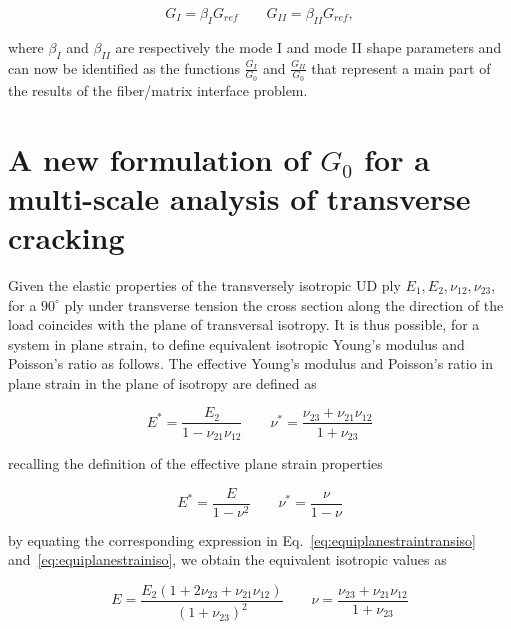 \documentclass[a4paper]{jpconf}
\begin{document}
\begin{equation}
G_{I}=\beta_{I} G_{ref}\qquad G_{II}=\beta_{II} G_{ref},
\end{equation}

where $\beta_{I}$ and $\beta_{II}$ are respectively the mode I and mode II shape parameters and can now be identified as the functions $\frac{G_{I}}{G_{0}}$ and $\frac{G_{II}}{G_{0}}$ that represent a main part of the results of the fiber/matrix interface problem.


\section{A new formulation of $G_{0}$ for a multi-scale analysis of transverse cracking}

Given the elastic properties of the transversely isotropic UD ply $E_{1},E_{2},\nu_{12},\nu_{23}$, for a $90^{\circ}$ ply under transverse tension the cross section along the direction of the load coincides with the plane of transversal isotropy. It is thus possible, for a system in plane strain, to define equivalent isotropic Young's modulus and Poisson's ratio as follows. The effective Young's modulus and Poisson's ratio in plane strain in the plane of isotropy are defined as

\begin{equation}\label{eq:equiplanestraintransiso}
E^{*}=\frac{E_{2}}{1-\nu_{21}\nu_{12}}\qquad\nu^{*}=\frac{\nu_{23}+\nu_{21}\nu_{12}}{1+\nu_{23}}
\end{equation}

recalling the definition of the effective plane strain properties

\begin{equation}\label{eq:equiplanestrainiso}
E^{*}=\frac{E}{1-\nu^{2}}\qquad\nu^{*}=\frac{\nu}{1-\nu}
\end{equation}

by equating the corresponding expression in Eq.~\ref{eq:equiplanestraintransiso} and~\ref{eq:equiplanestrainiso}, we obtain the equivalent isotropic values as

\begin{equation}
E=\frac{E_{2}\left(1+2\nu_{23}+\nu_{21}\nu_{12}\right)}{\left(1+\nu_{23}\right)^{2}}\qquad\nu=\frac{\nu_{23}+\nu_{21}\nu_{12}}{1+\nu_{23}}
\end{equation}
\end{document}
